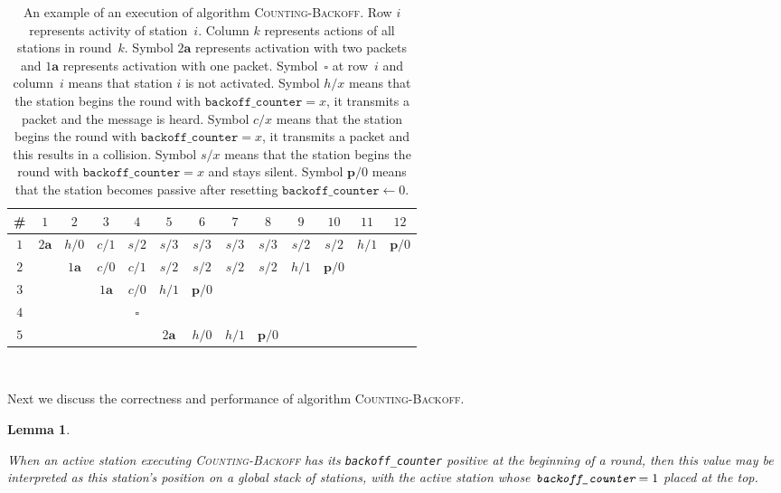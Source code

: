 \documentclass[11pt]{article}
\newlength{\pagewidth}
\newcommand{\RB}{\raisebox{2.5ex}{~}}
\newcommand{\LB}{\raisebox{-1.5ex}{~}}
\newtheorem{lemma}{Lemma}
\begin{document}
\begin{table}[t]
\begin{center}
\begin{tabular}{| c ||c |c |c |c |c | c | c | c | c | c | c | c | }
\hline
\RB \LB
\# & $1$ & $2$ & $3$ &$4$&$5$& $6$ & $7$& $8$& $9$ & $10$ & $11$ & $12$ \\
\hline\hline
\RB \LB
$1$& $2\boldsymbol{a}$  & $h/0$ & $c/1$ & $s/2$& $s/3$&$s/3$& $s/3$& $s/3$& $s/2$ &$s/2$&$h/1$&$\boldsymbol{p}/0$\\
\hline
\RB \LB
$2$ & & $1\boldsymbol{a}$ & $c/0$ &$c/1$& $s/2$& $s/2$& $s/2$&$s/2$&$h/1$ &$\boldsymbol{p}/0$&&\\
\hline
\RB \LB
$3$ & & & $1\boldsymbol{a}$& $c/0$&$h/1$ &$\boldsymbol{p}/0$ &&& &&&\\
\hline
\RB \LB
$4$ & & && $\boldsymbol{\square}$ & &&&& &&&\\
\hline
\RB \LB
$5$ & & &&&$2\boldsymbol{a}$ &$h/0$&$h/1$&$\boldsymbol{p}/0$& &&&\\
\hline
\end{tabular}
\parbox{\pagewidth}{
~
\caption{\label{tab:first-example-counting-backoff}
An example of an execution of algorithm \textsc{Counting-Backoff}.
Row $i$ represents activity of station~$i$.
Column $k$ represents actions of all stations in round~$k$.
Symbol $2\boldsymbol{a}$ represents activation with two packets and $1\boldsymbol{a}$ represents activation with one packet.
Symbol~$\boldsymbol{\square}$ at row~$i$  and column~$i$ means that station $i$ is not activated.
Symbol $h/x$ means that the station begins the round with $\texttt{backoff\_counter} = x$, it  transmits a packet and the message is heard.
Symbol $c/x$ means that the station begins the round with $\texttt{backoff\_counter} = x$, it  transmits a packet and this results in a collision.
Symbol $s/x$ means that the station begins the round with $\texttt{backoff\_counter} = x$ and stays silent.
Symbol $\boldsymbol{p}/0$ means that the station becomes passive after resetting $\texttt{backoff\_counter} \leftarrow 0$.
}}
\end{center}
\end{table}





Next we discuss the correctness and performance of algorithm  \textsc{Counting-Backoff}.



\begin{lemma}
\label{lem:stack}

When an active station executing \textsc{Counting-Backoff} has its \emph{\texttt{backoff\_counter}} positive at the beginning of a round, then this value may be interpreted as  this station's position on a global stack of stations, with the active station whose $\emph{\texttt{backoff\_counter}} =1$  placed at the top.
\end{lemma}
\end{document}
